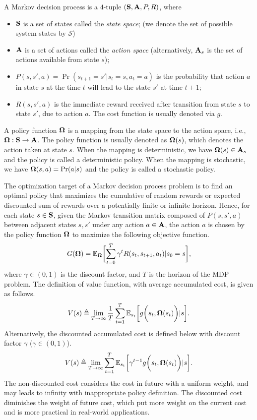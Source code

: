 A Markov decision process is a $4$-tuple $(\mathbf{S}, \mathbf{A}, P, R)$, where
\begin{itemize}
    \item $\mathbf{S}$ is a set of states called the \emph{state space}; (we denote the set of possible system states by $\mathcal{S}$)
    \item $\mathbf{A}$ is a set of actions called the \emph{action space} (alternatively, $\mathbf{A}_s$ is the set of actions available from state $s$);
    \item $P(s, s', a) = \Pr(s_{t+1}=s' | s_t=s, a_t=a)$ is the probability that action $a$ in state $s$ at the time $t$ will lead to the state $s'$ at time $t+1$;
    \item $R(s, s', a)$ is the immediate reward received after transition from state $s$ to state $s'$, due to action $a$. The cost function is usually denoted via $g$.
\end{itemize}
A policy function $\boldsymbol{\Omega}$ is a mapping from the state space to the action space, i.e., $\boldsymbol{\Omega}: \mathbf{S} \to \mathbf{A}$.
The policy function is usually denoted as $\boldsymbol{\Omega}(s)$, which denotes the action taken at state $s$.
When the mapping is deterministic, we have $\boldsymbol{\Omega}(s) \in \mathbf{A}_s$ and the policy is called a deterministic policy.
When the mapping is stochastic, we have $\boldsymbol{\Omega}(s, a) = \Pr(a | s)$ and the policy is called a stochastic policy.

The optimization target of a Markov decision process problem is to find an optimal policy that maximizes the cumulative of random rewards or expected discounted sum of rewards over a potentially finite or infinite horizon.
Hence, for each state $s \in \mathbf{S}$, given the Markov transition matrix composed of $P(s, s', a)$ between adjacent states $s, s'$ under any action $a\in\mathbf{A}$, the action $a$ is chosen by the policy function $\boldsymbol{\Omega}$ to maximize the following objective function.
\begin{align*}
    G(\Policy) = \mathbb{E}_{\Policy}\Bracket{
        \sum_{t=0}^{T} \gamma^{t} R(s_t, s_{t+1}, a_t) | s_0 = s
    },
\end{align*}
where $\gamma \in (0,1)$ is the discount factor, and $T$ is the horizon of the MDP problem.
The definition of value function, with average accumulated cost, is given as follows.
\begin{align*}
    V( s ) \triangleq \lim_{T\to\infty} \frac{1}{T}
    \sum_{t=1}^{T} \mathbb{E}_{s_t}\bigg[
       g\bigg( s_{t}, \boldsymbol{\Omega}(s_t) \bigg) | s
    \bigg].
\end{align*}
Alternatively, the discounted accumulated cost is defined below with discount factor $\gamma$ ($\gamma \in (0,1)$).
\begin{align*}
    V( s ) \triangleq \lim_{T\to\infty}
    \sum_{t=1}^{T} \mathbb{E}_{s_t}\bigg[
        \gamma^{t-1} g\bigg( s_t, \boldsymbol{\Omega}(s_t) \bigg) | s
    \bigg].
\end{align*}
The non-discounted cost considers the cost in future with a uniform weight, and may leads to infinity with inappropriate policy definition.
The discounted cost diminishes the weight of future cost, which put more weight on the current cost and is more practical in real-world applications.

